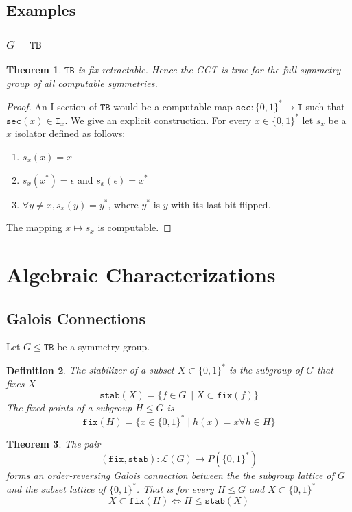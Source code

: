 \documentclass{article}
\newtheorem{theorem}{Theorem}[section]
\newtheorem{definition}[theorem]{Definition}
\newcommand{\bin}{\{0,1\}^*} %
\newcommand{\TB}{\mathtt{TB}}
\newcommand{\st}{\mathtt{stab}}
\newcommand{\I}{\mathtt{I}}
\newcommand{\fix}{\mathtt{fix}}
\newcommand{\s}{\mathtt{sec}}
\begin{document}
\subsection{Examples}
\subsubsection{$G = \TB$}
\begin{theorem}\cite{TrejoKreinovichLongpre2000}
    \label{thm:TB}
    $\TB$ is fix-retractable. Hence the GCT is true for the full symmetry group of all computable symmetries.
\end{theorem}
\begin{proof}An I-section of $\TB$ would be a computable map $\s: \bin \to \I$ such that $\s(x) \in \I_x$. We give an explicit construction. For every $x \in \bin$ let $s_x$ be a $x$ isolator defined as follows:
    \begin{enumerate}
        \item $s_x(x) = x$
        \item $s_x(x^*) = \epsilon$ and $s_x(\epsilon) = x^*$
        \item $\forall y \neq x, s_x(y) = y^*$, where $y^*$ is $y$ with its last bit flipped.
    \end{enumerate}
    The mapping $x \mapsto s_x$ is computable.
\end{proof}



\section{Algebraic Characterizations}
\subsection{Galois Connections}
Let $G \leq \TB$ be a symmetry group. 

\begin{definition}
The stabilizer of a subset $X \subset \{0,1\}^*$ is the subgroup of $G$ that fixes $X$
\begin{equation}
    \st(X) = \{f \in G\ \mid X \subset \fix(f)\}
\end{equation}
The fixed points of a subgroup $H \leq G$ is 
\begin{equation}
    \fix(H) = \{x \in \{0,1\}^* \mid h(x) = x \forall h \in H \}
\end{equation}
\end{definition}


\begin{theorem}
\label{thm:galois}
The pair 
\begin{equation}
(\fix, \st): \mathcal{L}(G) \to P(\bin) 
\end{equation}
forms an order-reversing Galois connection between the the subgroup lattice of $G$ and the subset lattice of $\{0,1\}^*$. That is for every $H \leq G$ and $X \subset \{0, 1\}^*$
\begin{equation}
    X \subset \fix(H) \iff H \leq \st(X)
\end{equation}
\end{theorem}
\end{document}
